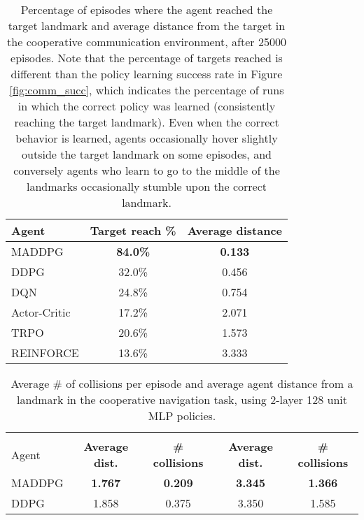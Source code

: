 \documentclass{article}
\begin{document}
\begin{table*}[ht!]
\small
\centering
\begin{tabular}{l c c}
\toprule
Agent & \textbf{Target reach \% }&    \textbf{Average distance}   \\ \hline
MADDPG &  \textbf{84.0\%} & \textbf{0.133}  \\
DDPG &  32.0\% & 0.456 \\
DQN & 24.8\% & 0.754 \\
Actor-Critic & 17.2\% & 2.071 \\
TRPO & 20.6\% & 1.573 \\
REINFORCE &  13.6\%  & 3.333 \\
\bottomrule
\end{tabular}
\caption{\label{tab:simple_speaker_listener} Percentage of episodes where the agent reached the target landmark and average distance from the target in the cooperative communication environment, after 25000 episodes. Note that the percentage of targets reached is different than the policy learning success rate in Figure \ref{fig:comm_succ}, which indicates the percentage of runs in which the correct policy was learned (consistently reaching the target landmark). Even when the correct behavior is learned, agents occasionally hover slightly outside the target landmark on some episodes, and conversely agents who learn to go to the middle of the landmarks occasionally stumble upon the correct landmark.}
\end{table*}


\begin{table*}[ht!]
\small
\centering
\begin{tabular}{l c c c c}
\toprule
& \multicolumn{2}{c}{ } & \multicolumn{2}{c}{ } \\
Agent & \textbf{Average dist.}&    \textbf{\# collisions} & \textbf{Average dist.}&    \textbf{\# collisions}   \\ \hline
MADDPG &  \textbf{1.767} & \textbf{0.209} & \textbf{3.345} & \textbf{1.366}  \\
DDPG &  1.858 & 0.375 & 3.350 & 1.585 \\
\bottomrule
\end{tabular}
\caption{\label{tab:simple_spread} Average \# of collisions per episode and average agent distance from a landmark in the cooperative navigation task, using 2-layer 128 unit MLP policies.}
\end{table*}
\end{document}
